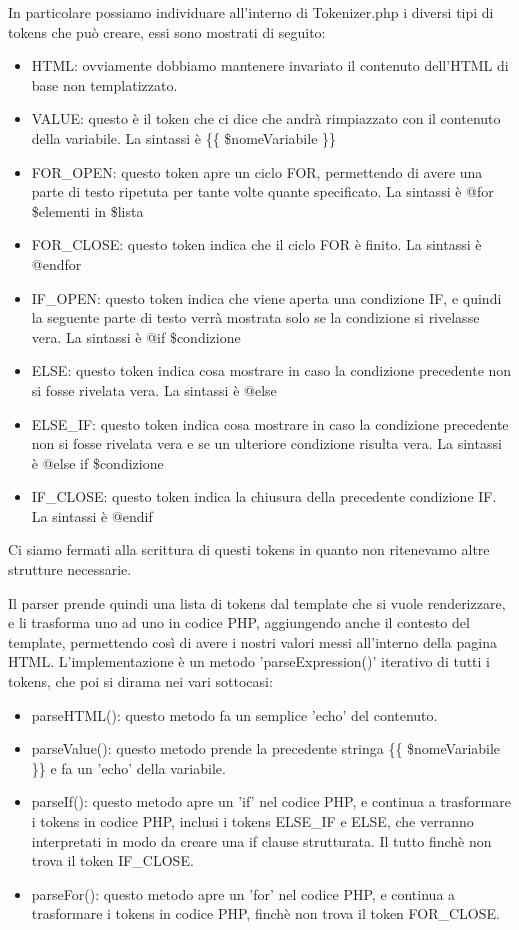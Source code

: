 In particolare possiamo individuare all'interno di Tokenizer.php i diversi tipi di tokens che può creare, essi sono mostrati di seguito:
\begin{itemize}
    \item HTML: ovviamente dobbiamo mantenere invariato il contenuto dell'HTML di base non templatizzato.
    \item VALUE: questo è il token che ci dice che andrà rimpiazzato con il contenuto della variabile. La sintassi è \{\{ \$nomeVariabile \}\}
    \item FOR\_OPEN: questo token apre un ciclo FOR, permettendo di avere una parte di testo ripetuta per tante volte quante specificato. La sintassi è @for \$elementi in \$lista
    \item FOR\_CLOSE: questo token indica che il ciclo FOR è finito. La sintassi è @endfor
    \item IF\_OPEN: questo token indica che viene aperta una condizione IF, e quindi la seguente parte di testo verrà mostrata solo se la condizione si rivelasse vera. La sintassi è @if \$condizione
    \item ELSE: questo token indica cosa mostrare in caso la condizione precedente non si fosse rivelata vera. La sintassi è @else
    \item ELSE\_IF: questo token indica cosa mostrare in caso la condizione precedente non si fosse rivelata vera e se un ulteriore condizione risulta vera. La sintassi è @else if \$condizione
    \item IF\_CLOSE: questo token indica la chiusura della precedente condizione IF. La sintassi è @endif
\end{itemize}

Ci siamo fermati alla scrittura di questi tokens in quanto non ritenevamo altre strutture necessarie.

Il parser prende quindi una lista di tokens dal template che si vuole renderizzare, e li trasforma uno ad uno in codice PHP, aggiungendo anche il contesto del template, permettendo così di avere i nostri valori messi all'interno della pagina HTML. L'implementazione è un metodo 'parseExpression()' iterativo di tutti i tokens, che poi si dirama nei vari sottocasi:
\begin{itemize}
    \item parseHTML(): questo metodo fa un semplice 'echo' del contenuto.
    \item parseValue(): questo metodo prende la precedente stringa \{\{ \$nomeVariabile \}\} e fa un 'echo' della variabile.
    \item parseIf(): questo metodo apre un 'if' nel codice PHP, e continua a trasformare i tokens in codice PHP, inclusi i tokens ELSE\_IF e ELSE, che verranno interpretati in modo da creare una if clause strutturata. Il tutto finchè non trova il token IF\_CLOSE.
    \item parseFor(): questo metodo apre un 'for' nel codice PHP, e continua a trasformare i tokens in codice PHP, finchè non trova il token FOR\_CLOSE.
\end{itemize}


